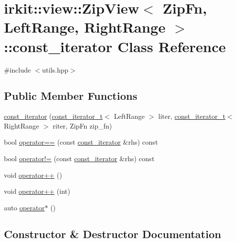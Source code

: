 \hypertarget{classirkit_1_1view_1_1ZipView_1_1const__iterator}{}\section{irkit\+:\+:view\+:\+:Zip\+View$<$ Zip\+Fn, Left\+Range, Right\+Range $>$\+:\+:const\+\_\+iterator Class Reference}
\label{classirkit_1_1view_1_1ZipView_1_1const__iterator}


{\ttfamily \#include $<$utils.\+hpp$>$}

\subsection*{Public Member Functions}
\begin{DoxyCompactItemize}
\item 
\mbox{\hyperlink{classirkit_1_1view_1_1ZipView_1_1const__iterator_a92caec773c73fe7720f274fdb4d14444}{const\+\_\+iterator}} (\mbox{\hyperlink{namespaceirkit_a4b1668583041117eb42c1b5a1091b804}{const\+\_\+iterator\+\_\+t}}$<$ Left\+Range $>$ liter, \mbox{\hyperlink{namespaceirkit_a4b1668583041117eb42c1b5a1091b804}{const\+\_\+iterator\+\_\+t}}$<$ Right\+Range $>$ riter, Zip\+Fn zip\+\_\+fn)
\item 
bool \mbox{\hyperlink{classirkit_1_1view_1_1ZipView_1_1const__iterator_a7cd1982ce6b7a658c69eca8ec3b211c1}{operator==}} (const \mbox{\hyperlink{classirkit_1_1view_1_1ZipView_1_1const__iterator}{const\+\_\+iterator}} \&rhs) const
\item 
bool \mbox{\hyperlink{classirkit_1_1view_1_1ZipView_1_1const__iterator_a64c38c56be6d9bbe7486b97f651c38d4}{operator!=}} (const \mbox{\hyperlink{classirkit_1_1view_1_1ZipView_1_1const__iterator}{const\+\_\+iterator}} \&rhs) const
\item 
void \mbox{\hyperlink{classirkit_1_1view_1_1ZipView_1_1const__iterator_afa50a93c355dff998a3872ead97c29d7}{operator++}} ()
\item 
void \mbox{\hyperlink{classirkit_1_1view_1_1ZipView_1_1const__iterator_a47598d8f9f86eabb28576be721c15d4a}{operator++}} (int)
\item 
auto \mbox{\hyperlink{classirkit_1_1view_1_1ZipView_1_1const__iterator_ae8a7914b8e3d6a1a0bbff1046708acd5}{operator$\ast$}} ()
\end{DoxyCompactItemize}


\subsection{Constructor \& Destructor Documentation}
\mbox{\label{classirkit_1_1view_1_1ZipView_1_1const__iterator_a92caec773c73fe7720f274fdb4d14444}} 
